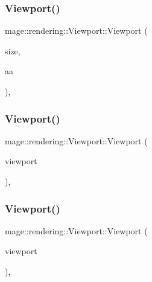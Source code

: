\subsubsection{\texorpdfstring{Viewport()}{Viewport()}\hspace{0.1cm}{\footnotesize\ttfamily [3/7]}}
{\footnotesize\ttfamily mage\+::rendering\+::\+Viewport\+::\+Viewport (\begin{DoxyParamCaption}\item[{const \hyperlink{namespacemage_a88e05bff0300120c013285d3dcad95c5}{U32x2} \&}]{size,  }\item[{\hyperlink{namespacemage_1_1rendering_ac3f75e49e92b42f2f5fb55c450d8899c}{Anti\+Aliasing}}]{aa }\end{DoxyParamCaption})\hspace{0.3cm}{\ttfamily [explicit]}, {\ttfamily [noexcept]}}

\hypertarget{classmage_1_1rendering_1_1_viewport_a0fb086c9d200adabbd18dcd6ac11495d}{}\label{classmage_1_1rendering_1_1_viewport_a0fb086c9d200adabbd18dcd6ac11495d} 
\subsubsection{\texorpdfstring{Viewport()}{Viewport()}\hspace{0.1cm}{\footnotesize\ttfamily [4/7]}}
{\footnotesize\ttfamily mage\+::rendering\+::\+Viewport\+::\+Viewport (\begin{DoxyParamCaption}\item[{D3\+D11\+\_\+\+V\+I\+E\+W\+P\+O\+RT}]{viewport }\end{DoxyParamCaption})\hspace{0.3cm}{\ttfamily [explicit]}, {\ttfamily [noexcept]}}

\hypertarget{classmage_1_1rendering_1_1_viewport_ae5fe479caecadc9639d359c139517da6}{}\label{classmage_1_1rendering_1_1_viewport_ae5fe479caecadc9639d359c139517da6} 
\subsubsection{\texorpdfstring{Viewport()}{Viewport()}\hspace{0.1cm}{\footnotesize\ttfamily [5/7]}}
{\footnotesize\ttfamily mage\+::rendering\+::\+Viewport\+::\+Viewport (\begin{DoxyParamCaption}\item[{const \hyperlink{classmage_1_1rendering_1_1_viewport}{Viewport} \&}]{viewport }\end{DoxyParamCaption})\hspace{0.3cm}{\ttfamily [default]}, {\ttfamily [noexcept]}}


